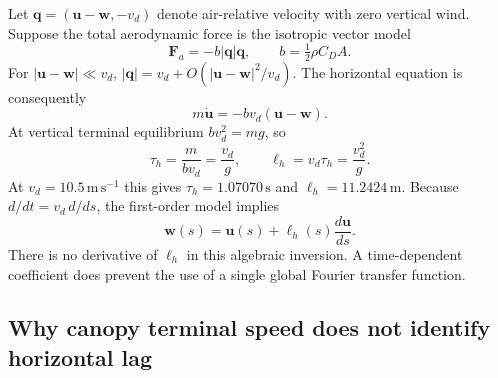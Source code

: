 \documentclass[11pt,a4paper]{article}
\numberwithin{equation}{section}
\begin{document}
Let $\boldsymbol q=(\boldsymbol u-\boldsymbol w,-v_d)$ denote air-relative
velocity with zero vertical wind. Suppose the total aerodynamic force is
the isotropic vector model
\begin{equation}
 \boldsymbol F_a=-b\lvert\boldsymbol q\rvert\boldsymbol q,
 \qquad b=\tfrac12\rho C_DA.
\end{equation}
For $\lvert\boldsymbol u-\boldsymbol w\rvert\ll v_d$,
$\lvert\boldsymbol q\rvert=v_d+O(\lvert\boldsymbol u-\boldsymbol w\rvert^2/v_d)$.
The horizontal equation is consequently
\begin{equation}
 m\dot{\boldsymbol u}=-bv_d(\boldsymbol u-\boldsymbol w).
\end{equation}
At vertical terminal equilibrium $bv_d^2=mg$, so
\begin{equation}
 \tau_h=\frac{m}{bv_d}=\frac{v_d}{g},\qquad
 \ell_h=v_d\tau_h=\frac{v_d^2}{g}.
\end{equation}
At $v_d=10.5\,\mathrm{m\,s^{-1}}$ this gives
$\tau_h=1.07070\,\mathrm s$ and $\ell_h=11.2424\,\mathrm m$.
Because $d/dt=v_d\,d/ds$, the first-order model implies
\begin{equation}
 \boldsymbol w(s)=\boldsymbol u(s)+\ell_h(s)
                       \frac{d\boldsymbol u}{ds}.
\end{equation}
There is no derivative of $\ell_h$ in this algebraic inversion. A
time-dependent coefficient does prevent the use of a single global Fourier
transfer function.

\subsection{Why canopy terminal speed does not identify horizontal lag}
\end{document}
